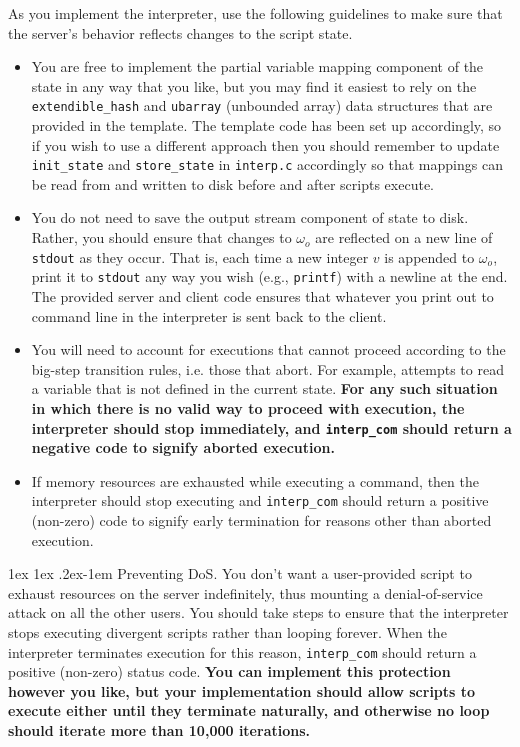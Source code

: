 \documentclass[11pt]{article}
\makeatletter
\renewcommand{\paragraph}{%
  \@startsection{paragraph}{4}%
  {\z@}{1ex \@plus 1ex \@minus .2ex}{-1em}%
  {\normalfont\normalsize\bfseries}
}
\makeatother
\begin{document}
As you implement the interpreter, use the following guidelines to make sure that the server's behavior reflects changes to the script state.
\begin{itemize} 
  \item You are free to implement the partial variable mapping component of the state in any way that you like, but you may find it easiest to rely on the \verb'extendible_hash' and \verb'ubarray' (unbounded array) data structures that are provided in the template. The template code has been set up accordingly, so if you wish to use a different approach then you should remember to update \verb'init_state' and \verb'store_state' in \verb'interp.c' accordingly so that mappings can be read from and written to disk before and after scripts execute.
  \item You do not need to save the output stream component of state to disk. Rather, you should ensure that changes to $\omega_o$ are reflected on a new line of \verb'stdout' as they occur. That is, each time a new integer $v$ is appended to $\omega_o$, print it to \verb'stdout' any way you wish (e.g., \verb'printf') with a newline at the end. The provided server and client code ensures that whatever you print out to command line in the interpreter is sent back to the client.
  \item You will need to account for executions that cannot proceed according to the big-step transition rules, i.e. those that abort. For example, attempts to read a variable that is not defined in the current state. \textbf{For any such situation in which there is no valid way to proceed with execution, the interpreter should stop immediately, and \texttt{interp\_com} should return a negative code to signify aborted execution.}
  \item If memory resources are exhausted while executing a command, then the interpreter should stop executing and \verb'interp_com' should return a positive (non-zero) code to signify early termination for reasons other than aborted execution.
\end{itemize}

\paragraph{Preventing DoS.} You don't want a user-provided script to exhaust resources on the server indefinitely, thus mounting a denial-of-service attack on all the other users. You should take steps to ensure that the interpreter stops executing divergent scripts rather than looping forever. When the interpreter terminates execution for this reason, \verb'interp_com' should return a positive (non-zero) status code. \textbf{You can implement this protection however you like, but your implementation should allow scripts to execute either until they terminate naturally, and otherwise no loop should iterate more than 10,000 iterations.}
\end{document}
